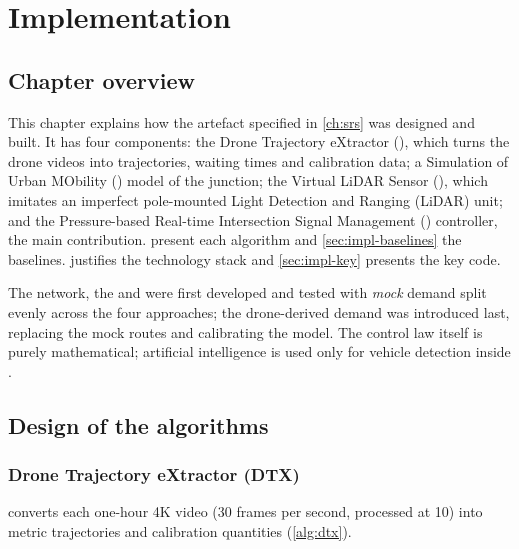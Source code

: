 \chapter{Implementation}\label{ch:impl}

\section{Chapter overview}

This chapter explains how the artefact specified in \cref{ch:srs} was designed and built. It has four components: the Drone Trajectory eXtractor (\dtx{}), which turns the drone videos into trajectories, waiting times and calibration data; a Simulation of Urban MObility (\sumo{}) model of the junction; the Virtual LiDAR Sensor (\vls{}), which imitates an imperfect pole-mounted Light Detection and Ranging (LiDAR) unit; and the Pressure-based Real-time Intersection Signal Management (\prism{}) controller, the main contribution.
 present each algorithm and \cref{sec:impl-baselines} the baselines.  justifies the technology stack and \cref{sec:impl-key} presents the key code.

The \sumo{} network, the \vls{} and \prism{} were first developed and tested with \emph{mock} demand split evenly across the four approaches; the drone-derived demand was introduced last, replacing the mock routes and calibrating the model. The control law itself is purely mathematical; artificial intelligence is used only for
vehicle detection inside \dtx{}.

\section{Design of the algorithms}\label{sec:impl-design}

\subsection{Drone Trajectory eXtractor (DTX)}\label{sec:impl-dtx}

\dtx{} converts each one-hour 4K video (30 frames per second, processed at 10) into metric trajectories and calibration quantities (\cref{alg:dtx}).

